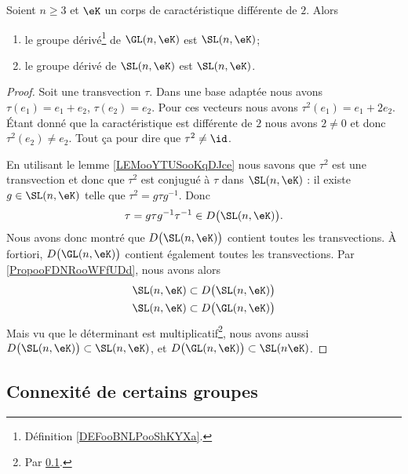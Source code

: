 \begin{proposition}      \label{PROPooSAOTooIlpJoY}
	Soient \( n\geq 3\) et \( \eK\) un corps de caractéristique différente de \( 2\). Alors
	\begin{enumerate}
		\item
		      le groupe dérivé\footnote{Définition \ref{DEFooBNLPooShKYXa}.} de \( \GL(n,\eK)\) est \( \SL(n,\eK)\);  
		\item
		      le groupe dérivé de \( \SL(n,\eK)\) est \( \SL(n,\eK)\).  
	\end{enumerate}
\end{proposition}

\begin{proof}
	Soit une transvection \( \tau\). Dans une base adaptée nous avons \( \tau(e_1)=e_1+e_2\), \( \tau(e_2)=e_2\). Pour ces vecteurs nous avons \( \tau^2(e_1)=e_1+2e_2\). Étant donné que la caractéristique est différente de \( 2\) nous avons \( 2\neq 0\) et donc \( \tau^2(e_2)\neq e_2\). Tout ça pour dire que \( \tau^2\neq \id\).

	En utilisant le lemme \ref{LEMooYTUSooKqDJce} nous savons que \( \tau^2\) est une transvection et donc que \( \tau^2\) est conjugué à \( \tau\) dans \( \SL(n,\eK)\) : il existe \( g\in \SL(n,\eK)\) telle que \( \tau^2=g\tau g^{-1}\). Donc
	\begin{equation}
		\tau=g\tau g^{-1}\tau^{-1}\in D\big( \SL(n,\eK) \big).
	\end{equation}
	Nous avons donc montré que \( D\big( \SL(n,\eK) \big)\) contient toutes les transvections. À fortiori, \( D\big( \GL(n,\eK) \big)\) contient également toutes les transvections. Par \ref{PropooFDNRooWFfUDd}, nous avons alors
	\begin{subequations}
		\begin{align}
			\SL(n,\eK) & \subset D\big( \SL(n,\eK) \big) \\
			\SL(n,\eK) & \subset D\big( \GL(n,\eK) \big)
		\end{align}
	\end{subequations}
	Mais vu que le déterminant est multiplicatif\footnote{Par \ref{}.}, nous avons aussi \( D\big( \SL(n,\eK) \big)\subset \SL(n,\eK)\), et \( D\big( \GL(n,\eK) \big)\subset\SL(n\eK)\).
\end{proof}

\subsection{Connexité  de certains groupes}

